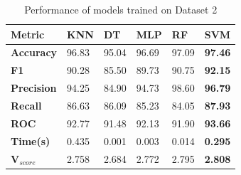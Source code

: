 \begin{table}[H]
  \centering
  \caption{Performance of models trained on Dataset 2}\label{tab:performance_of_models_trained_on_dataset_2}
  \begin{tabular}{|p{5em}|C{3em}|C{3em}|C{3em}|C{3em}|C{3em}|}
    \hline
    \textbf{Metric}      & \textbf{KNN} & \textbf{DT} & \textbf{MLP} & \textbf{RF} & \textbf{SVM}   \\
    \hline
    \textbf{Accuracy}    & 96.83        & 95.04       & 96.69        & 97.09       & \textbf{97.46} \\
    \textbf{F1}          & 90.28        & 85.50       & 89.73        & 90.75       & \textbf{92.15} \\
    \textbf{Precision}   & 94.25        & 84.90       & 94.73        & 98.60       & \textbf{96.79} \\
    \textbf{Recall}      & 86.63        & 86.09       & 85.23        & 84.05       & \textbf{87.93} \\
    \textbf{ROC}         & 92.77        & 91.48       & 92.13        & 91.90       & \textbf{93.66} \\
    \textbf{Time(s)}     & 0.435        & 0.001       & 0.003        & 0.014       & \textbf{0.295} \\
    \textbf{V$_{score}$} & 2.758        & 2.684       & 2.772        & 2.795       & \textbf{2.808} \\
    \hline
  \end{tabular}
\end{table}

